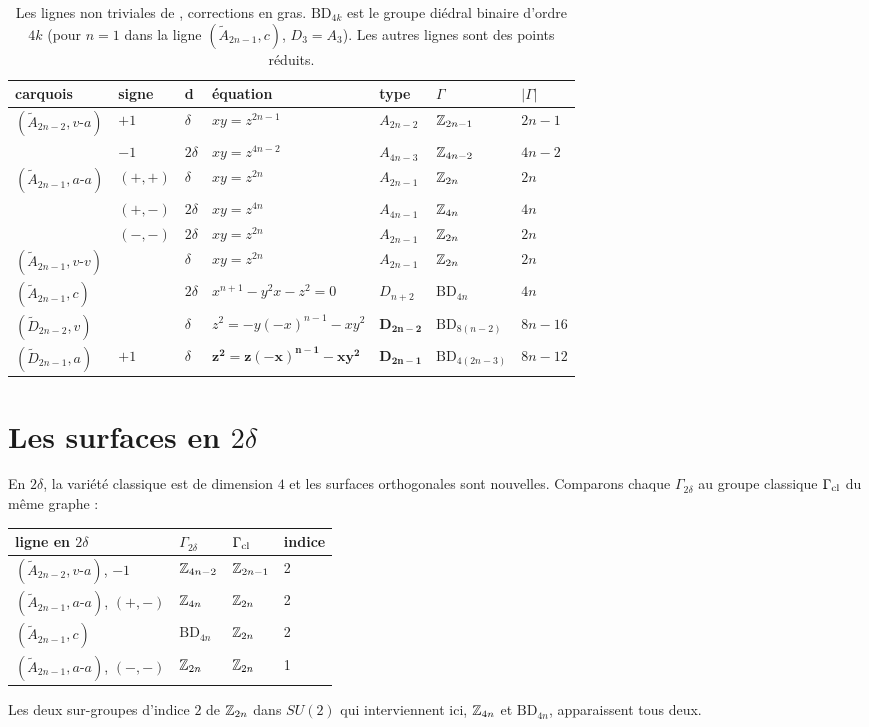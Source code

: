 \documentclass[11pt]{article}
\theoremstyle{definition}
\theoremstyle{remark}
\newcommand{\BD}{\mathrm{BD}}
\begin{document}
\begin{table}[h]\centering\small
\begin{tabular}{@{}lllllll@{}}
\toprule
carquois & signe & d & équation & type & $\Gamma$ & $|\Gamma|$\\\midrule
$(\widetilde A_{2n-2},v\text{-}a)$ & $+1$ & $\delta$ & $xy=z^{2n-1}$ & $A_{2n-2}$ & $\mathbb{Z}_{2n-1}$ & $2n-1$\\
 & $-1$ & $2\delta$ & $xy=z^{4n-2}$ & $A_{4n-3}$ & $\mathbb{Z}_{4n-2}$ & $4n-2$\\
$(\widetilde A_{2n-1},a\text{-}a)$ & $(+,+)$ & $\delta$ & $xy=z^{2n}$ & $A_{2n-1}$ & $\mathbb{Z}_{2n}$ & $2n$\\
 & $(+,-)$ & $2\delta$ & $xy=z^{4n}$ & $A_{4n-1}$ & $\mathbb{Z}_{4n}$ & $4n$\\
 & $(-,-)$ & $2\delta$ & $xy=z^{2n}$ & $A_{2n-1}$ & $\mathbb{Z}_{2n}$ & $2n$\\
$(\widetilde A_{2n-1},v\text{-}v)$ & & $\delta$ & $xy=z^{2n}$ & $A_{2n-1}$ & $\mathbb{Z}_{2n}$ & $2n$\\
$(\widetilde A_{2n-1},c)$ & & $2\delta$ & $x^{n+1}-y^2x-z^2=0$ & $D_{n+2}$ & $\BD_{4n}$ & $4n$\\
$(\widetilde D_{2n-2},v)$ & & $\delta$ & $z^2=-y(-x)^{n-1}-xy^2$ & $\mathbf{D_{2n-2}}$ & $\BD_{8(n-2)}$ & $8n-16$\\
$(\widetilde D_{2n-1},a)$ & $+1$ & $\delta$ & $\mathbf{z^2=z(-x)^{n-1}-xy^2}$ & $\mathbf{D_{2n-1}}$ & $\BD_{4(2n-3)}$ & $8n-12$\\\bottomrule
\end{tabular}
\caption{Les lignes non triviales de \cite[th.~1.2]{Pin26}, corrections en gras. $\BD_{4k}$ est le groupe diédral binaire d'ordre $4k$ (pour $n=1$ dans la ligne $(\widetilde A_{2n-1},c)$, $D_3=A_3$). Les autres lignes sont des points réduits.}\label{tab:main}
\end{table}

\section{Les surfaces en $2\delta$}\label{sec:2delta}
En $2\delta$, la variété classique est de dimension $4$ et les surfaces orthogonales sont nouvelles. Comparons chaque $\Gamma_{2\delta}$ au groupe classique $\Gamma_{\rm cl}$ du même graphe :
\begin{center}\small
\begin{tabular}{@{}llll@{}}\toprule
ligne en $2\delta$ & $\Gamma_{2\delta}$ & $\Gamma_{\rm cl}$ & indice\\\midrule
$(\widetilde A_{2n-2},v\text{-}a)$, $-1$ & $\mathbb{Z}_{4n-2}$ & $\mathbb{Z}_{2n-1}$ & 2\\
$(\widetilde A_{2n-1},a\text{-}a)$, $(+,-)$ & $\mathbb{Z}_{4n}$ & $\mathbb{Z}_{2n}$ & 2\\
$(\widetilde A_{2n-1},c)$ & $\BD_{4n}$ & $\mathbb{Z}_{2n}$ & 2\\
$(\widetilde A_{2n-1},a\text{-}a)$, $(-,-)$ & $\mathbb{Z}_{2n}$ & $\mathbb{Z}_{2n}$ & 1\\\bottomrule
\end{tabular}
\end{center}
Les deux sur-groupes d'indice $2$ de $\mathbb{Z}_{2n}$ dans $SU(2)$ qui interviennent ici, $\mathbb{Z}_{4n}$ et $\BD_{4n}$, apparaissent tous deux.
\end{document}
